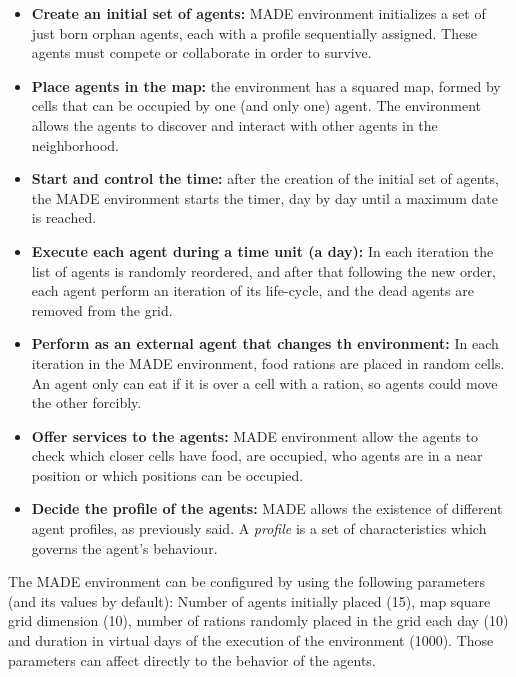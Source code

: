 \documentclass{sig-alternate}
\begin{document}
\begin{itemize}
\item \textbf{Create an initial set of agents:} MADE environment
  initializes a set of just born orphan agents, each with a profile
  sequentially assigned.
 These agents must compete or collaborate in order to survive.
\item \textbf{Place agents in the map:} the environment has a squared map, formed by cells that can be occupied by one (and only one) agent. The environment allows the agents to discover and interact with other agents in the neighborhood.
\item \textbf{Start and control the time:} after the creation of the initial set of agents, the MADE environment starts the timer, day by day until a maximum date is reached.
\item \textbf{Execute each agent during a time unit (a day):} In each iteration the list of agents is randomly reordered, and after that following the new order, each agent perform an iteration of its life-cycle, and the dead agents are removed from the grid.
\item \textbf{Perform as an external agent that changes th environment:} In each iteration in the MADE environment, food rations are placed in random cells. An agent only can eat if it is over a cell with a ration, so agents could move the other forcibly.
\item \textbf{Offer services to the agents:} MADE environment allow the agents to check which closer cells have food, are occupied, who agents are in a near position or which positions can be occupied.
\item \textbf{Decide the profile of the agents:} MADE allows the existence of different agent profiles, as previously said. A {\em profile} is a set of characteristics which governs the agent's behaviour.
\end{itemize}

The MADE environment can be configured by using the following parameters (and its values by default): Number of agents initially placed (15), map square grid dimension (10), number of rations randomly placed in the grid each day (10) and duration in virtual days of the  execution of the environment (1000). Those parameters can affect directly to the behavior of the agents.

\end{document}
